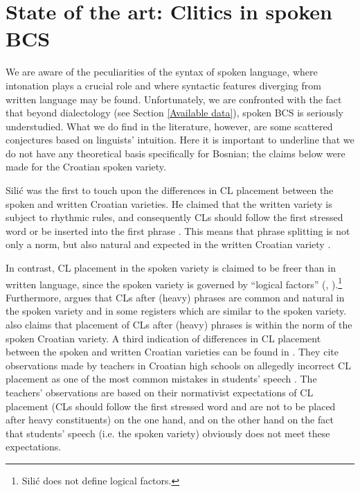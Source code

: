 \section{State of the art: Clitics in spoken BCS}
\label{State of the art: Clitics in spoken BCS}
We are aware of the peculiarities of the syntax of spoken language, where intonation plays a crucial role and where syntactic features diverging from written language may be found. Unfortunately, we are confronted with the fact that beyond dialectology (see Section \ref{Available data}), spoken BCS is seriously understudied. What we do find in the literature, however, are some scattered conjectures based on linguists’ intuition. Here it is important to underline that we do not have any theoretical basis specifically for Bosnian; the claims below were made for the Croatian spoken variety. 

Silić was the first to touch upon the differences in CL placement between the spoken and written Croatian varieties. He claimed that the written variety is subject to rhythmic rules, and consequently CLs should follow the first stressed word or be inserted into the first phrase \citep[cf.][391]{Silic78}. This means that phrase splitting is not only a norm, but also natural and expected in the written Croatian variety \citep[cf.][225]{Silic06}. 

In contrast, CL placement in the spoken variety is claimed to be freer than in written language, since the spoken variety is governed by “logical factors” (\citealt[cf.][391]{Silic78}, \citeyear[28]{Silic84}).\footnote{Silić does not define logical factors.} Furthermore, \citet[225]{Silic06} argues that CLs after (heavy) phrases are common and natural in the spoken variety and in some registers which are similar to the spoken variety. \citet[63]{Alexander09} also claims that placement of CLs after (heavy) phrases is within the norm of the spoken Croatian variety. A third indication of differences in CL placement between the spoken and written Croatian varieties can be found in \citet[464]{KedvesWerkmann13}. They cite observations made by teachers in Croatian high schools on allegedly incorrect CL placement as one of the most common mistakes in students’ speech \citep[464]{KedvesWerkmann13}. The teachers’ observations are based on their normativist expectations of CL placement (CLs should follow the first stressed word and are not to be placed after heavy constituents) on the one hand, and on the other hand on the fact that students’ speech (i.e. the spoken variety) obviously does not meet these expectations. 

